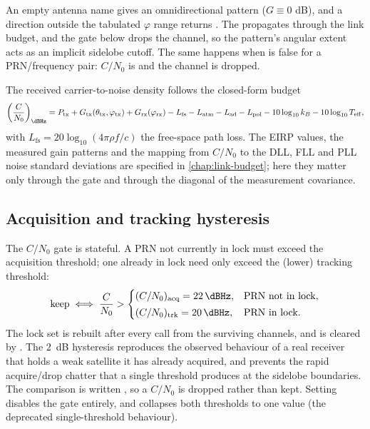 An empty antenna name gives an omnidirectional pattern ($G \equiv 0$
\si{\dB}), and a direction outside the tabulated $\varphi$ range returns
. The  propagates through the link budget, and the
gate below drops the channel, so the pattern's angular extent acts as an
implicit sidelobe cutoff. The same happens when
 is false for a PRN/frequency pair: $C/N_0$ is
 and the channel is dropped.

The received carrier-to-noise density follows the closed-form budget
\citep[Eq.~6.59]{iiyama2026thesis}
\begin{equation}
  \label{eq:gnss-cn0}
  \left(\frac{C}{N_0}\right)_{\si{\dBHz}}
  = P_{\mathrm{tx}}
  + G_{\mathrm{tx}}(\theta_{\mathrm{tx}}, \varphi_{\mathrm{tx}})
  + G_{\mathrm{rx}}(\varphi_{\mathrm{rx}})
  - L_{\mathrm{fs}} - L_{\mathrm{atm}} - L_{\mathrm{ad}} - L_{\mathrm{pol}}
  - 10\log_{10} k_B - 10\log_{10} T_{\mathrm{eff}} ,
\end{equation}
with $L_{\mathrm{fs}} = 20\log_{10}(4\pi \rho f / c)$ the free-space path
loss. The EIRP values, the measured gain patterns and the mapping from
$C/N_0$ to the DLL, FLL and PLL noise standard deviations are specified in
\cref{chap:link-budget}; here they matter only through the gate and through
the diagonal of the measurement covariance.

\subsection{Acquisition and tracking hysteresis}

The $C/N_0$ gate is stateful. A PRN not currently in lock must exceed the
acquisition threshold; one already in lock need only exceed the (lower)
tracking threshold:
\begin{equation}
  \label{eq:gnss-cn0-gate}
  \text{keep} \iff
  \frac{C}{N_0} >
  \begin{cases}
    (C/N_0)_{\mathrm{acq}} = \SI{22}{\dBHz}, & \text{PRN not in lock},\\[2pt]
    (C/N_0)_{\mathrm{trk}} = \SI{20}{\dBHz}, & \text{PRN in lock}.
  \end{cases}
\end{equation}
The lock set  is rebuilt after every
 call from the surviving channels, and is cleared by
. The \SI{2}{\dB} hysteresis reproduces the observed
behaviour of a real receiver that holds a weak satellite it has already
acquired, and prevents the rapid acquire/drop chatter that a single threshold
produces at the sidelobe boundaries. The comparison is written
, so a  $C/N_0$ is dropped rather than
kept. Setting  disables the gate
entirely, and  collapses both thresholds to one value
(the deprecated single-threshold behaviour).

